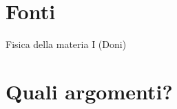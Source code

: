 \section{Fonti}

\begin{wordonframe}{Fisica della materia I (Doni)}

\end{wordonframe}


\section{Quali argomenti?}

